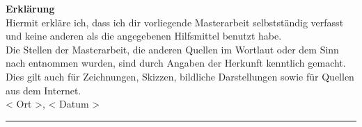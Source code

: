 \begin{otherlanguage}{ngerman}
	\textbf{Erkl\"arung}\\[1.0cm]
Hiermit erkl\"are ich, dass ich dir vorliegende Masterarbeit selbstst\"andig verfasst und keine anderen als die angegebenen Hilfsmittel benutzt habe.\\[0.5cm]
Die Stellen der Masterarbeit, die anderen Quellen im Wortlaut oder dem Sinn nach entnommen wurden, sind durch Angaben der Herkunft kenntlich gemacht. Dies gilt auch f\"ur Zeichnungen, Skizzen, bildliche Darstellungen sowie f\"ur Quellen aus dem Internet.
 \vspace{4\baselineskip}\\
< Ort >, < Datum > \hfill \rule{.3\linewidth}{0.4pt} \\
\end{otherlanguage}